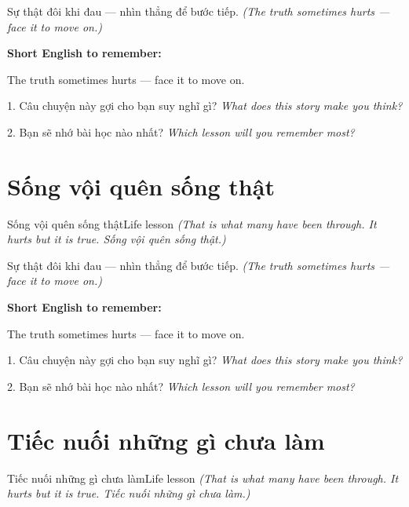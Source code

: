 \begin{baihoc}
Sự thật đôi khi đau — nhìn thẳng để bước tiếp.
\textit{(The truth sometimes hurts — face it to move on.)}
\end{baihoc}

\begin{ghinhoanh}
\textbf{Short English to remember:}

The truth sometimes hurts — face it to move on.

\end{ghinhoanh}

\begin{tuhocnhanh}
1. Câu chuyện này gợi cho bạn suy nghĩ gì? \textit{What does this story make you think?}

2. Bạn sẽ nhớ bài học nào nhất? \textit{Which lesson will you remember most?}
\end{tuhocnhanh}
\ngancach


\section{Sống vội quên sống thật}
\begin{truyen}{Sống vội quên sống thật}{Life lesson}
\textit{(That is what many have been through. It hurts but it is true. Sống vội quên sống thật.)}
\end{truyen}

\begin{baihoc}
Sự thật đôi khi đau — nhìn thẳng để bước tiếp.
\textit{(The truth sometimes hurts — face it to move on.)}
\end{baihoc}

\begin{ghinhoanh}
\textbf{Short English to remember:}

The truth sometimes hurts — face it to move on.

\end{ghinhoanh}

\begin{tuhocnhanh}
1. Câu chuyện này gợi cho bạn suy nghĩ gì? \textit{What does this story make you think?}

2. Bạn sẽ nhớ bài học nào nhất? \textit{Which lesson will you remember most?}
\end{tuhocnhanh}
\ngancach


\section{Tiếc nuối những gì chưa làm}
\begin{truyen}{Tiếc nuối những gì chưa làm}{Life lesson}
\textit{(That is what many have been through. It hurts but it is true. Tiếc nuối những gì chưa làm.)}
\end{truyen}

